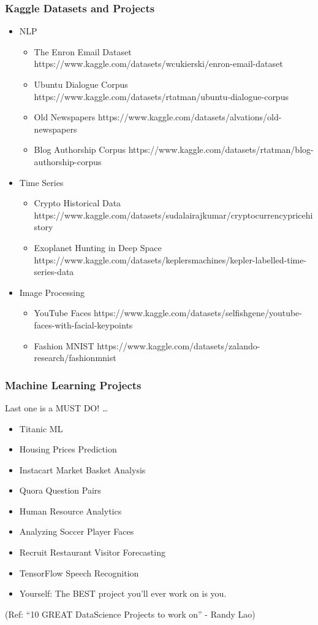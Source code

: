 \begin{frame}\frametitle{Kaggle Datasets and Projects}
\footnotesize
\begin{itemize}
\item NLP
\begin{itemize}
\item The Enron Email Dataset https://www.kaggle.com/datasets/wcukierski/enron-email-dataset
\item Ubuntu Dialogue Corpus https://www.kaggle.com/datasets/rtatman/ubuntu-dialogue-corpus
\item Old Newspapers https://www.kaggle.com/datasets/alvations/old-newspapers
\item Blog Authorship Corpus https://www.kaggle.com/datasets/rtatman/blog-authorship-corpus
\end{itemize}
\item Time Series
\begin{itemize}
\item Crypto Historical Data https://www.kaggle.com/datasets/sudalairajkumar/cryptocurrencypricehistory
\item Exoplanet Hunting in Deep Space https://www.kaggle.com/datasets/keplersmachines/kepler-labelled-time-series-data
\end{itemize}
\item Image Processing
\begin{itemize}
\item YouTube Faces https://www.kaggle.com/datasets/selfishgene/youtube-faces-with-facial-keypoints
\item Fashion MNIST https://www.kaggle.com/datasets/zalando-research/fashionmnist
\end{itemize}
\end{itemize}
\end{frame}

\begin{frame}\frametitle{Machine Learning Projects}
Last one is a MUST DO! \ldots

\footnotesize
\begin{itemize}
\item  Titanic ML
\item  Housing Prices Prediction 
\item  Instacart Market Basket Analysis 
\item  Quora Question Pairs 
\item  Human Resource Analytics 
\item  Analyzing Soccer Player Faces
\item  Recruit Restaurant Visitor Forecasting 
\item  TensorFlow Speech Recognition 
\item  Yourself: The BEST project you'll ever work on is you.
\end{itemize}

(Ref: ``10 GREAT DataScience Projects to work on'' - Randy Lao)
\end{frame}


